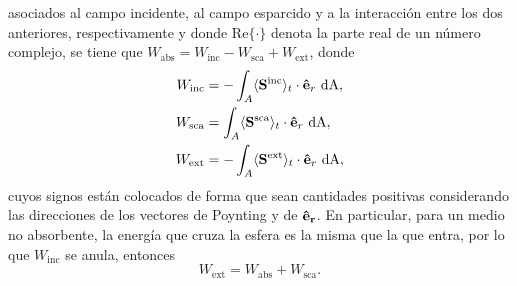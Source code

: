 \noindent asociados al campo incidente, al campo esparcido y a la interacción entre los dos anteriores, respectivamente y donde Re$\{\cdot\}$ denota la parte real de un número complejo, se tiene que $W_{\text{abs}}=W_{\text{inc}}-W_{\text{sca}}+W_{\text{ext}}$, donde \cite{bohrenAbsorptionScatteringLight2008}
%
\begin{align} \label{eqs:W}
	W_{\text{inc}}  &= -\int_{A}\langle\vb{S}^{\text{inc}}\rangle_t\cdot\vu{e}_r\text{ dA},\label{Wi}\\ W_{\text{sca}}&=\int_{A}\langle\vb{S^{\text{sca}}}\rangle_t\cdot\vu{e}_r\text{ dA}, \label{Ws} \\ 
	W_{\text{ext}} &= -\int_{A}\langle\vb{S^{\text{ext}}}\rangle_t\cdot\vu{e}_r\text{ dA},\label{Wext} 
\end{align}
%
cuyos signos están colocados de forma que sean cantidades positivas considerando las direcciones de los vectores de Poynting y de $\vb{\hat{e}_r}$. En particular, para un medio no absorbente, la energía que cruza la esfera es la misma que la que entra, por lo que $W_{\text{inc}}$ se anula, entonces
%
\begin{equation}
	W_{\text{ext}}=W_{\text{abs}}+W_{\text{sca}}.
\end{equation}


